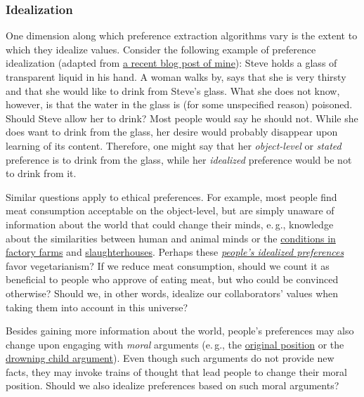 \subsubsection{Idealization}\label{idealization}

One dimension along which preference extraction algorithms vary is the
extent to which they idealize values. Consider the following example of
preference idealization (adapted from
\href{https://casparoesterheld.com/2017/01/18/is-it-a-bias-or-just-a-preference-an-interesting-issue-in-preference-idealization/}{a
recent blog post of mine}): Steve holds a glass of transparent liquid
in his hand. A woman walks by, says that she is very thirsty and that
she would like to drink from Steve's glass. What she does not know,
however, is that the water in the glass is (for some unspecified reason)
poisoned. Should Steve allow her to drink? Most people would say he
should not. While she does want to drink from the glass, her desire
would probably disappear upon learning of its content. Therefore, one
might say that her \emph{object-level} or \emph{stated} preference is to
drink from the glass, while her \emph{idealized} preference would be not
to drink from it.

Similar questions apply to ethical preferences. For example, most people
find meat consumption acceptable on the object-level, but are simply
unaware of information about the world that could change their minds,
e.\,g., knowledge about the similarities between human and animal minds or
the
\href{https://en.wikipedia.org/wiki/Animal_welfare\#Farm_animals}{conditions
in factory farms} and
\href{https://en.wikipedia.org/wiki/Slaughterhouse\#Animal_welfare_concerns}{slaughterhouses}.
Perhaps these
\href{http://www.telegraph.co.uk/food-and-drink/news/number-of-vegans-in-britain-rises-by-360-in-10-years/}{\emph
    {people's idealized preferences}} favor vegetarianism? If we reduce meat consumption, should we
count it as beneficial to people who approve of eating meat, but who could be convinced
otherwise? Should we, in other words, idealize our collaborators' values when taking them into
account in this universe?

Besides gaining more information about the world, people's preferences
may also change upon engaging with \emph{moral} arguments (e.\,g., the
\href{http://plato.stanford.edu/entries/original-position/}{original
position} or the
\href{https://en.wikipedia.org/wiki/Famine,_Affluence,_and_Morality}{drowning
child argument}). Even though such arguments do not provide new facts,
they may invoke trains of thought that lead people to change their moral
position. Should we also idealize preferences based on such moral
arguments?


